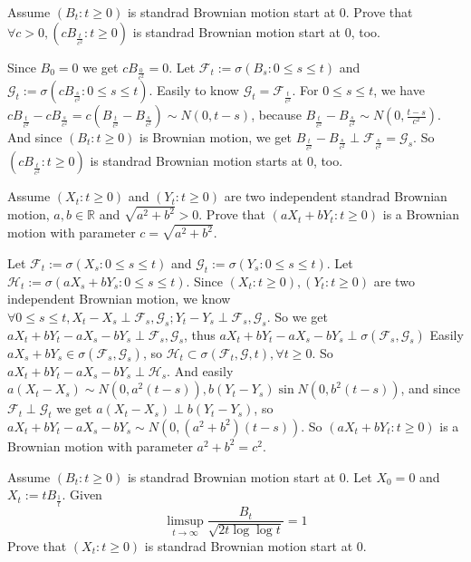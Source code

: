 \documentclass{ctexart}
\begin{document}
\begin{problem}\label{pro:2}
  Assume \((B_t:t \geq 0)\) is standrad Brownian motion start at \(0\).
  Prove that \(\forall c>0,(c B_{\frac{t}{c^2}}:t \geq 0)\) is standrad Brownian motion start at \(0\), too.
\end{problem}
\begin{solution}
  Since \(B_0=0\) we get \(c B_{\frac{0}{c^2}}=0\).
  Let \(\mathcal{F}_t:=\sigma(B_s:0 \leq s \leq t)\) and \(\mathcal{G}_t:=\sigma(c B_{\frac{s}{c^2}}:0 \leq s \leq t)\).
  Easily to know \(\mathcal{G}_t=\mathcal{F}_{\frac{t}{c^2}}\).
  For \(0 \leq s \leq t\), we have \(c B_{\frac{t}{c^2}}-c B_{\frac{s}{c^2}}= c(B_{\frac{t}{c^2}}-B_{\frac{s}{c^2}}) \sim N(0,t-s)\),
  because \(B_{\frac{t}{c^2}}-B_{\frac{s}{c^2}} \sim N(0,\frac{t-s}{c^2})\).
  And since \((B_t:t \geq 0)\) is Brownian motion, we get \(B_{\frac{t}{c^2}}-B_{\frac{s}{c^2}} \perp \mathcal{F}_{\frac{s}{c^2}}=\mathcal{G}_s\).
  So \((c B_{\frac{t}{c^2}}:t \geq 0)\) is standrad Brownian motion starts at \(0\), too.
\end{solution}
\begin{problem}\label{pro:3}
  Assume \((X_t:t \geq 0)\) and \((Y_t:t \geq 0)\) are two independent standrad Brownian motion, \(a,b \in \mathbb{R}\) and \(\sqrt{a^2 + b^2} >0\).
  Prove that \((aX_t + bY_t:t \geq 0)\) is a Brownian motion with parameter \(c=\sqrt{a^2 + b^2}\).
\end{problem}
\begin{solution}
  Let \(\mathcal{F}_t:=\sigma(X_s:0 \leq s \leq t)\) and \(\mathcal{G}_t:=\sigma(Y_s:0 \leq s \leq t)\).
  Let \(\mathcal{H}_t:=\sigma(a X_s + b Y_s:0 \leq s \leq t)\).
  Since \((X_t:t \geq 0),(Y_t:t \geq 0)\) are two independent Brownian motion, we know \(\forall 0 \leq s \leq t,X_t - X_s \perp \mathcal{F}_s,\mathcal{G}_s;Y_t-Y_s \perp \mathcal{F}_s,\mathcal{G}_s\).
  So we get \(aX_t+bY_t-aX_s-bY_s \perp \mathcal{F}_s,\mathcal{G}_s\), thus \(aX_t+bY_t-aX_s-bY_s \perp \sigma(\mathcal{F}_s,\mathcal{G}_s)\)
  Easily \(a X_s+bY_s \in \sigma(\mathcal{F}_s,\mathcal{G}_s)\), so \(\mathcal{H}_t \subset \sigma(\mathcal{F}_t,\mathcal{G},t),\forall t \geq 0\).
  So \(a X_t+bY_t-aX_s-bY_s \perp \mathcal{H}_s\).
  And easily \(a(X_t-X_s) \sim N(0,a^2(t-s)),b(Y_t-Y_s) \sin N(0,b^2(t-s))\), and since \(\mathcal{F}_t \perp \mathcal{G}_t\) we get \(a(X_t-X_s) \perp b(Y_t-Y_s)\),
  so \(a X_t+bY_t-aX_s-bY_s \sim N(0,(a^2 + b^2)(t-s))\).
  So \((a X_t + b Y_t:t \geq 0)\) is a Brownian motion with parameter \(a^2 + b^2 = c^2\).
\end{solution}
\begin{problem}\label{pro:4}
  Assume \((B_t:t \geq 0)\) is standrad Brownian motion start at \(0\).
  Let \(X_0=0\) and \(X_t:=t B_{\frac{1}{t}}\).
  Given
  \[
    \limsup_{t \to \infty}\frac{B_{t}}{\sqrt{2t \log \log t}}=1
  \]
  Prove that \((X_t:t \geq 0)\) is standrad Brownian motion start at \(0\).
\end{problem}
\begin{solution}

\end{solution}
\end{document}
